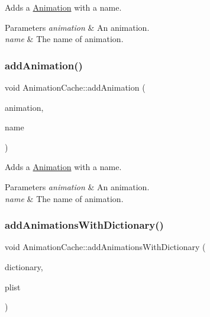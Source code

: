 Adds a \hyperlink{classAnimation}{Animation} with a name.


\begin{DoxyParams}{Parameters}
{\em animation} & An animation. \\
\hline
{\em name} & The name of animation. \\
\hline
\end{DoxyParams}
\mbox{\label{classAnimationCache_a520a7c0199b75c670195210fa79703d9}} 
\subsubsection{\texorpdfstring{add\+Animation()}{addAnimation()}\hspace{0.1cm}{\footnotesize\ttfamily [2/2]}}
{\footnotesize\ttfamily void Animation\+Cache\+::add\+Animation (\begin{DoxyParamCaption}\item[{\hyperlink{classAnimation}{Animation} $\ast$}]{animation,  }\item[{const std\+::string \&}]{name }\end{DoxyParamCaption})}

Adds a \hyperlink{classAnimation}{Animation} with a name.


\begin{DoxyParams}{Parameters}
{\em animation} & An animation. \\
\hline
{\em name} & The name of animation. \\
\hline
\end{DoxyParams}
\mbox{\label{classAnimationCache_a7a67abb700f3f21efcb2f69ed44b886a}} 
\subsubsection{\texorpdfstring{add\+Animations\+With\+Dictionary()}{addAnimationsWithDictionary()}\hspace{0.1cm}{\footnotesize\ttfamily [1/2]}}
{\footnotesize\ttfamily void Animation\+Cache\+::add\+Animations\+With\+Dictionary (\begin{DoxyParamCaption}\item[{const Value\+Map \&}]{dictionary,  }\item[{const std\+::string \&}]{plist }\end{DoxyParamCaption})}

